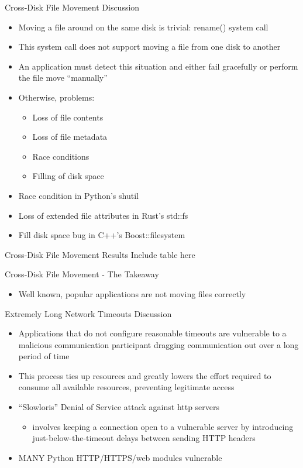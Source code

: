 \documentclass[pdf]{beamer}
\begin{document}
\begin{frame}{Cross-Disk File Movement Discussion}
  \begin{itemize}
  \item{Moving a file around on the same disk is trivial: rename() system
      call}
  \item{This system call does not support moving a file from one disk to
      another}
  \item{An application must detect this situation and either fail
      gracefully or perform the file move ``manually''}
  \item{Otherwise, problems:}
    \begin{itemize}
    \item{Loss of file contents}
    \item{Loss of file metadata}
    \item{Race conditions}
    \item{Filling of disk space}
    \end{itemize}
  \item{Race condition in Python's shutil}
  \item{Loss of extended file attributes in Rust's std::fs}
  \item{Fill disk space bug in C++'s Boost::filesystem}
  \end{itemize}
\end{frame}


\begin{frame}{Cross-Disk File Movement Results}
  Include table here
\end{frame}


\begin{frame}{Cross-Disk File Movement - The Takeaway}
  \begin{itemize}
    \item{Well known, popular applications are not moving files correctly}
  \end{itemize}
\end{frame}


\begin{frame}{Extremely Long Network Timeouts Discussion}
  \begin{itemize}
  \item{Applications that do not configure reasonable timeouts are vulnerable
      to a malicious communication participant dragging communication out over a
      long period of time}
  \item{This process ties up resources and greatly lowers the effort required to
      consume all available resources, preventing legitimate access}
  \item{``Slowloris'' Denial of Service attack against http servers}
    \begin{itemize}
    \item{involves keeping a connection open to a vulnerable server by
        introducing just-below-the-timeout delays between sending HTTP headers}
        \end{itemize}
  \item{MANY Python HTTP/HTTPS/web modules vulnerable}
  \end{itemize}
\end{frame}
\end{document}
